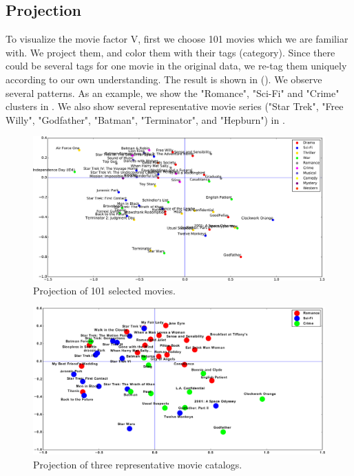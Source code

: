 \documentclass[12pt]{article}
\begin{document}
\subsection{Projection}
To visualize the movie factor V, first we choose 101 movies which we are familiar with. We project them, and color them with their tags (category). Since there could be several tags for one movie in the original data, we re-tag them uniquely according to our own understanding. The result is shown in (). We observe several patterns. As an example, we show the "Romance", "Sci-Fi" and "Crime" clusters in . We also show several representative movie series ("Star Trek", "Free Willy", "Godfather", "Batman", "Terminator", and "Hepburn") in .


\begin{figure}[h!]
  \centering
      \includegraphics[width=\textwidth]{1_All_Movies_Seen-crop.pdf}
  \caption{Projection of 101 selected movies.}
  \label{fig:all}
\end{figure}

\begin{figure}[h!]
  \centering
      \includegraphics[width=\textwidth]{2_Three_Clusters_with_Name_adjust-crop.pdf}
  \caption{Projection of three representative movie catalogs.}
  \label{fig:cluster}
\end{figure}
\end{document}
